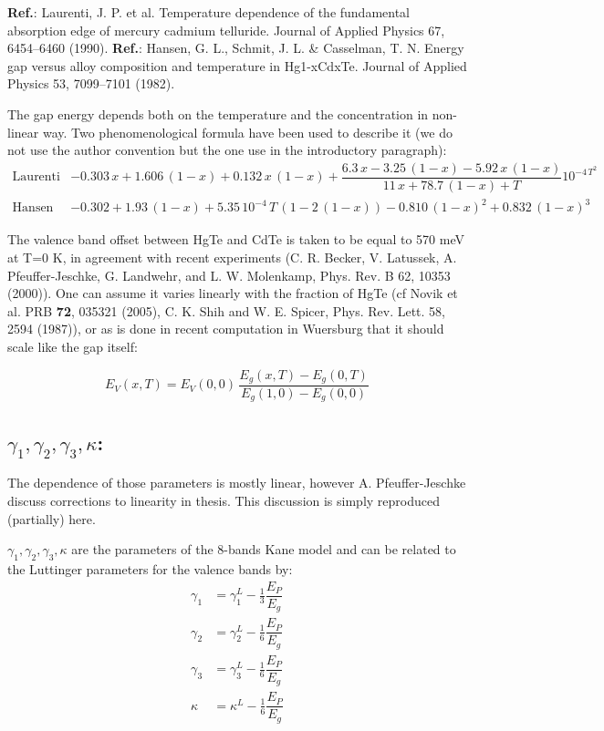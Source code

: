 \documentclass[prb,aps]{revtex4}
\begin{document}
        {\bf Ref.}:  Laurenti, J. P. et al. Temperature dependence of the fundamental absorption edge of mercury cadmium telluride. Journal of Applied Physics 67, 6454–6460 (1990).
        {\bf Ref.}:  Hansen, G. L., Schmit, J. L. \& Casselman, T. N. Energy gap versus alloy composition and temperature in Hg1-xCdxTe. Journal of Applied Physics 53, 7099–7101 (1982).


        The gap energy depends both on the temperature and the concentration in non-linear way. Two phenomenological formula have been used to describe it (we do not use the author convention but the one use in the introductory paragraph):
        \begin{align}
            \text{Laurenti}& -0.303\,x + 1.606\,(1-x) + 0.132\,x\,(1-x) + \dfrac{6.3\,x - 3.25\,(1-x) - 5.92\,x\,(1-x)}{11\,x + 78.7\,(1-x) + T}10^{-4\,T^2}\\
            \text{Hansen}& -0.302 + 1.93\,(1-x) + 5.35\,10^{-4}\,T\,(1-2\,(1-x)) -0.810\,(1-x)^2 + 0.832\,(1-x)^3
        \end{align}

        The valence band offset between HgTe and CdTe is taken to be equal to 570 meV at T=0 K, in  agreement  with  recent  experiments (C. R. Becker, V. Latussek, A. Pfeuffer-Jeschke, G. Landwehr, and L. W. Molenkamp, Phys. Rev. B 62, 10353 (2000)). One can assume it varies linearly with the fraction of HgTe (cf Novik et al. PRB {\bf 72}, 035321 (2005), C. K. Shih and W. E. Spicer, Phys. Rev. Lett. 58, 2594 (1987)), or as is done in recent computation in Wuersburg that it should scale like the gap itself:

        \begin{equation}
            E_V(x, T) = E_V(0, 0)\,\frac{E_g(x, T) - E_g(0, T)}{E_g(1, 0) - E_g(0, 0)}
        \end{equation}

    \subsection{$γ_1, γ_2, γ_3, κ$:}

        The dependence of those parameters is mostly linear, however A. Pfeuffer-Jeschke discuss corrections to linearity in thesis. This discussion is simply reproduced (partially) here.

        $γ_1, γ_2, γ_3, κ$ are the parameters of the 8-bands Kane model and can be related to the Luttinger parameters for the valence bands by:
        \begin{align}
            γ_1 &= γ_1^L - \frac13 \dfrac{E_P}{E_g}\\
            γ_2 &= γ_2^L - \frac16 \dfrac{E_P}{E_g}\\
            γ_3 &= γ_3^L - \frac16 \dfrac{E_P}{E_g}\\
            κ &= κ^L - \frac16 \dfrac{E_P}{E_g}\\
        \end{align}
\end{document}
